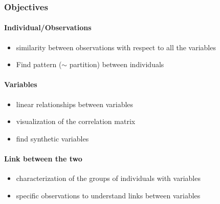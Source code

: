 \documentclass{beamer}\usepackage[]{graphicx}\usepackage[]{color}
\begin{document}
\begin{frame}
  \frametitle{Objectives}
  
\paragraph{Individual/Observations}
  
  \begin{itemize}
    \item similarity between observations with respect to all the variables 
    \item Find pattern ($\sim$ partition) between individuals
  \end{itemize}

\vfill

\paragraph{Variables} 
  
  \begin{itemize}
  \item linear relationships between variables 
  \item visualization of the correlation matrix
  \item find synthetic variables
  \end{itemize}

\vfill

\paragraph{Link between the two}
  
  \begin{itemize}
    \item characterization of the groups of individuals with variables
    \item specific observations to understand links between variables
  \end{itemize}

\end{frame}



\end{document}

